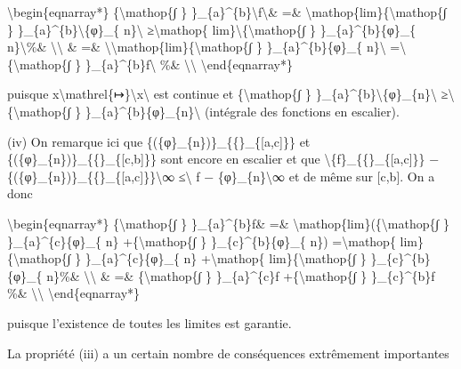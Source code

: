 \documentclass[]{article}
\begin{document}
\textbackslash{}begin\{eqnarray*\} \{\textbackslash{}mathop\{∫ \}
\}\_\{a\}\^{}\{b\}\textbackslash{}\textbar{}f\textbackslash{}\textbar{}\&
=\& \textbackslash{}mathop\{lim\}\{\textbackslash{}mathop\{∫ \}
\}\_\{a\}\^{}\{b\}\textbackslash{}\textbar{}\{φ\}\_\{
n\}\textbackslash{}\textbar{} ≥\textbackslash{}mathop\{
lim\}\textbackslash{}\textbar{}\{\textbackslash{}mathop\{∫ \}
\}\_\{a\}\^{}\{b\}\{φ\}\_\{ n\}\textbackslash{}\textbar{}\%\&
\textbackslash{}\textbackslash{} \& =\&
\textbackslash{}\textbar{}\textbackslash{}mathop\{lim\}\{\textbackslash{}mathop\{∫
\} \}\_\{a\}\^{}\{b\}\{φ\}\_\{ n\}\textbackslash{}\textbar{}
=\textbackslash{}\textbar{}\{\textbackslash{}mathop\{∫ \}
\}\_\{a\}\^{}\{b\}f\textbackslash{}\textbar{} \%\&
\textbackslash{}\textbackslash{} \textbackslash{}end\{eqnarray*\}

puisque
x\textbackslash{}mathrel\{↦\}\textbackslash{}\textbar{}x\textbackslash{}\textbar{}
est continue et \{\textbackslash{}mathop\{∫ \}
\}\_\{a\}\^{}\{b\}\textbackslash{}\textbar{}\{φ\}\_\{n\}\textbackslash{}\textbar{}
≥\textbackslash{}\textbar{}\{\textbackslash{}mathop\{∫ \}
\}\_\{a\}\^{}\{b\}\{φ\}\_\{n\}\textbackslash{}\textbar{} (intégrale des
fonctions en escalier).

(iv) On remarque ici que
\{(\{φ\}\_\{n\})\}\_\{\{\textbar{}\}\_\{{[}a,c{]}\}\} et
\{(\{φ\}\_\{n\})\}\_\{\{\textbar{}\}\_\{{[}c,b{]}\}\} sont encore en
escalier et que
\textbackslash{}\textbar{}\{f\}\_\{\{\textbar{}\}\_\{{[}a,c{]}\}\} −
\{(\{φ\}\_\{n\})\}\_\{\{\textbar{}\}\_\{{[}a,c{]}\}\}\textbackslash{}\textbar{}∞
≤\textbackslash{}\textbar{} f − \{φ\}\_\{n\}\textbackslash{}\textbar{}∞
et de même sur {[}c,b{]}. On a donc

\textbackslash{}begin\{eqnarray*\} \{\textbackslash{}mathop\{∫ \}
\}\_\{a\}\^{}\{b\}f\& =\&
\textbackslash{}mathop\{lim\}(\{\textbackslash{}mathop\{∫ \}
\}\_\{a\}\^{}\{c\}\{φ\}\_\{ n\} +\{\textbackslash{}mathop\{∫ \}
\}\_\{c\}\^{}\{b\}\{φ\}\_\{ n\}) =\textbackslash{}mathop\{
lim\}\{\textbackslash{}mathop\{∫ \} \}\_\{a\}\^{}\{c\}\{φ\}\_\{ n\}
+\textbackslash{}mathop\{ lim\}\{\textbackslash{}mathop\{∫ \}
\}\_\{c\}\^{}\{b\}\{φ\}\_\{ n\}\%\& \textbackslash{}\textbackslash{} \&
=\& \{\textbackslash{}mathop\{∫ \} \}\_\{a\}\^{}\{c\}f
+\{\textbackslash{}mathop\{∫ \} \}\_\{c\}\^{}\{b\}f \%\&
\textbackslash{}\textbackslash{} \textbackslash{}end\{eqnarray*\}

puisque l'existence de toutes les limites est garantie.

La propriété (iii) a un certain nombre de conséquences extrêmement
importantes
\end{document}
